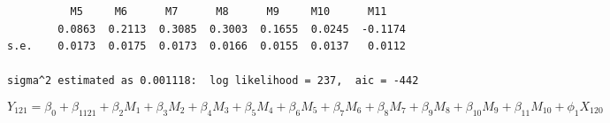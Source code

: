 \documentclass[12pt]{article}
\newenvironment{solution}[2][Solution]{\begin{trivlist}
	\item[\hskip \labelsep {\bfseries #1}]}{\end{trivlist}}
\begin{document}
\begin{solution}{}
\begin{enumerate}[label=(\alph*)]
\begin{lstlisting}
       	  M5 	 M6      M7      M8      M9     M10      M11
      	0.0863  0.2113  0.3085  0.3003  0.1655  0.0245  -0.1174
s.e.  	0.0173  0.0175  0.0173  0.0166  0.0155  0.0137   0.0112

sigma^2 estimated as 0.001118:  log likelihood = 237,  aic = -442
		\end{lstlisting}
		
		\begin{equation*}
		Y_{121} = \beta_0 + \beta_1121 + \beta_2M_1 + \beta_3M_2 + \beta_4M_3 + \beta_5M_4 + \beta_6M_5 + \beta_7M_6 + \beta_8M_7 + \beta_9M_8 + \beta_{10}M_9 + \beta_{11}M_10 + \phi_1 X_{120} 
		\end{equation*}
			
	\end{enumerate}

	\end{solution}
	\pagebreak
	
	
\end{document}
